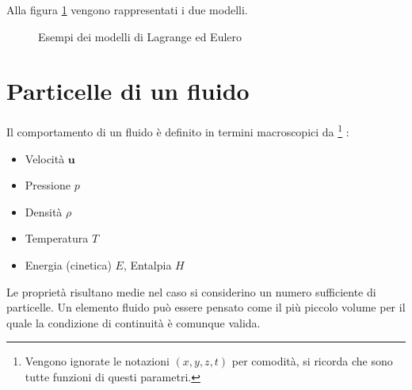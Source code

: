 Alla figura \ref{fig:ModelliLagEul} vengono rappresentati i due modelli.

\begin{figure}
\centering
{}\quad
{}
\caption{Esempi dei modelli di Lagrange ed Eulero}
\label{fig:ModelliLagEul}
\end{figure}

\section{Particelle di un fluido}
Il comportamento di un fluido è definito in termini macroscopici da%
\footnote{Vengono ignorate le notazioni $(x, y, z, t)$ per comodità, si ricorda che sono tutte funzioni di questi parametri.}
:
\begin{itemize}
\item Velocità $\textbf{u}$
\item Pressione $p$
\item Densità $\rho$
\item Temperatura $T$
\item Energia (cinetica) $E$, Entalpia $H$
\end{itemize}
Le proprietà risultano medie nel caso si considerino un numero sufficiente di particelle.
Un elemento fluido può essere pensato come il più piccolo volume per il quale la condizione di continuità è comunque valida.

